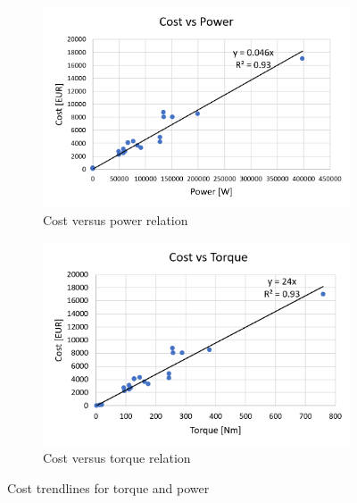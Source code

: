 \begin{figure}[htb]
    \centering
    \begin{subfigure}[b]{0.45\textwidth}
        \includegraphics[width=\textwidth]{CostAnalysis/Figures/costvspower.PNG}
        \caption{Cost versus power relation}
        \label{fig:costvspow}
    \end{subfigure}
    \begin{subfigure}[b]{0.45\textwidth}
        \includegraphics[width=\textwidth]{CostAnalysis/Figures/costvstorque.PNG}
        \caption{Cost versus torque relation}
        \label{fig:costvstor}
    \end{subfigure}
    \caption{Cost trendlines for torque and power}
    \label{fig:costtrendlines}
\end{figure}


